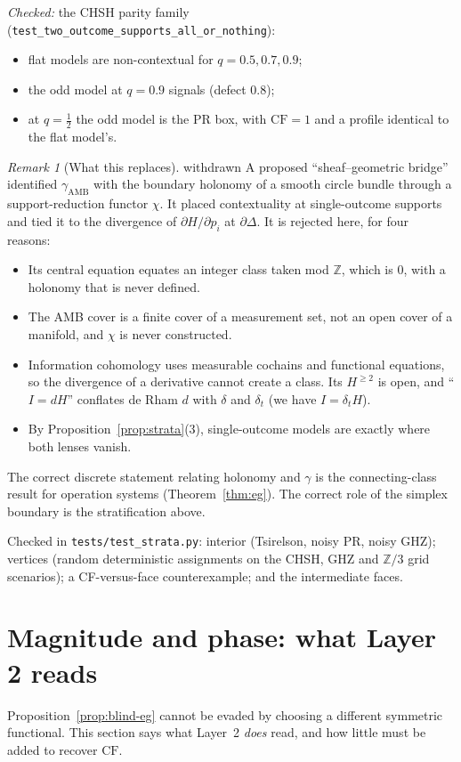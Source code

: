\documentclass[11pt]{article}
\theoremstyle{definition}
\theoremstyle{remark}
\newtheorem{remark}[theorem]{Remark}
\newcommand{\Z}{\mathbb{Z}}
\newcommand{\CF}{\mathrm{CF}}
\newcommand{\st}[1]{\textsf{\small\color{gray}#1}}
\begin{document}
\noindent\emph{Checked:} the CHSH parity family (\texttt{test\_two\_outcome\_supports\_all\_or\_nothing}):
\begin{itemize}
  \item flat models are non-contextual for $q=0.5,0.7,0.9$;
  \item the odd model at $q=0.9$ signals (defect $0.8$);
  \item at $q=\tfrac12$ the odd model is the PR box, with $\CF=1$ and a profile identical to the flat model's.
\end{itemize}

\begin{remark}[What this replaces]\st{withdrawn}
A proposed ``sheaf--geometric bridge'' identified $\gamma_{\mathrm{AMB}}$ with the boundary holonomy of a smooth circle bundle through a support-reduction functor $\chi$. It placed contextuality at single-outcome supports and tied it to the divergence of $\partial H/\partial p_i$ at $\partial\Delta$. It is rejected here, for four reasons:
\begin{itemize}
  \item Its central equation equates an integer class taken mod $\Z$, which is $0$, with a holonomy that is never defined.
  \item The AMB cover is a finite cover of a measurement set, not an open cover of a manifold, and $\chi$ is never constructed.
  \item Information cohomology uses measurable cochains and functional equations, so the divergence of a derivative cannot create a class. Its $H^{\ge2}$ is open, and ``$I=dH$'' conflates de Rham $d$ with $\delta$ and $\delta_t$ (we have $I=\delta_tH$).
  \item By Proposition~\ref{prop:strata}(3), single-outcome models are exactly where both lenses vanish.
\end{itemize}
The correct discrete statement relating holonomy and $\gamma$ is the connecting-class result for operation systems (Theorem~\ref{thm:eg}). The correct role of the simplex boundary is the stratification above.
\end{remark}
\noindent Checked in \texttt{tests/test\_strata.py}: interior (Tsirelson, noisy PR, noisy GHZ); vertices (random deterministic assignments on the CHSH, GHZ and $\Z/3$ grid scenarios); a CF-versus-face counterexample; and the intermediate faces.

\section{Magnitude and phase: what Layer 2 reads}\label{sec:magphase}
Proposition~\ref{prop:blind-eg} cannot be evaded by choosing a different symmetric functional. This section says what Layer~2 \emph{does} read, and how little must be added to recover $\CF$.
\end{document}
